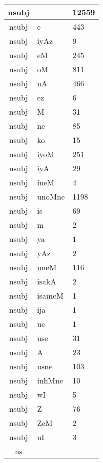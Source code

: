 \documentclass[a4 paper]{article}
\begin{document}
\begin{longtable}{cp{}p{}}
nsubj &  & 12559\\ \midrule nsubj & e & 443\\ \midrule nsubj & iyAz & 9\\ \midrule nsubj & eM & 245\\ \midrule nsubj & oM & 811\\ \midrule nsubj & nA & 466\\ \midrule nsubj & ez & 6\\ \midrule nsubj & M & 31\\ \midrule nsubj & ne & 85\\ \midrule nsubj & ko & 15\\ \midrule nsubj & iyoM & 251\\ \midrule nsubj & iyA & 29\\ \midrule nsubj & ineM & 4\\ \midrule nsubj & unoMne & 1198\\ \midrule nsubj & is & 69\\ \midrule nsubj & m & 2\\ \midrule nsubj & ya & 1\\ \midrule nsubj & yAz & 2\\ \midrule nsubj & uneM & 116\\ \midrule nsubj & isakA & 2\\ \midrule nsubj & isameM & 1\\ \midrule nsubj & ija & 1\\ \midrule nsubj & ue & 1\\ \midrule nsubj & use & 31\\ \midrule nsubj & A & 23\\ \midrule nsubj & usne & 103\\ \midrule nsubj & inhMne & 10\\ \midrule nsubj & wI & 5\\ \midrule nsubj & Z & 76\\ \midrule nsubj & ZeM & 2\\ \midrule nsubj & uI & 3\\ \midrule ns
\end{longtable}
\end{document}
